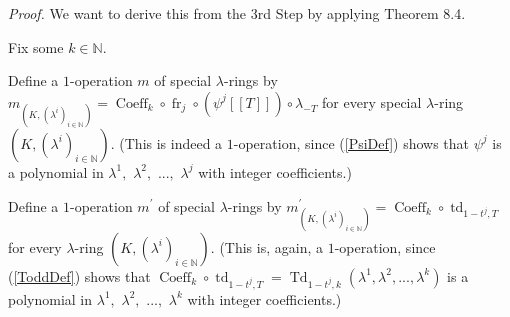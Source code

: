 \documentclass[numbers=enddot,12pt,final,onecolumn,notitlepage]{scrartcl}%
\begin{document}
\textit{Proof.} We want to derive this from the 3rd Step by applying Theorem 8.4.

Fix some $k\in\mathbb{N}$.

Define a $1$-operation $m$ of special $\lambda$-rings by $m_{\left(  K,\left(
\lambda^{i}\right)  _{i\in\mathbb{N}}\right)  }=\operatorname*{Coeff}%
\nolimits_{k}\circ\operatorname*{fr}\nolimits_{j}\circ\left(  \psi^{j}\left[
\left[  T\right]  \right]  \right)  \circ\lambda_{-T}$ for every special
$\lambda$-ring $\left(  K,\left(  \lambda^{i}\right)  _{i\in\mathbb{N}%
}\right)  $. (This is indeed a $1$-operation, since (\ref{PsiDef}) shows that
$\psi^{j}$ is a polynomial in $\lambda^{1},$ $\lambda^{2},$ $...,$
$\lambda^{j}$ with integer coefficients.)

Define a $1$-operation $m^{\prime}$ of special $\lambda$-rings by $m_{\left(
K,\left(  \lambda^{i}\right)  _{i\in\mathbb{N}}\right)  }^{\prime
}=\operatorname*{Coeff}\nolimits_{k}\circ\operatorname*{td}\nolimits_{1-t^{j}%
,T}$ for every $\lambda$-ring $\left(  K,\left(  \lambda^{i}\right)
_{i\in\mathbb{N}}\right)  $. (This is, again, a $1$-operation, since
(\ref{ToddDef}) shows that $\operatorname*{Coeff}\nolimits_{k}\circ
\operatorname*{td}\nolimits_{1-t^{j},T}=\operatorname*{Td}\nolimits_{1-t^{j}%
,k}\left(  \lambda^{1},\lambda^{2},...,\lambda^{k}\right)  $ is a polynomial
in $\lambda^{1},$ $\lambda^{2},$ $...,$ $\lambda^{k}$ with integer coefficients.)
\end{document}
